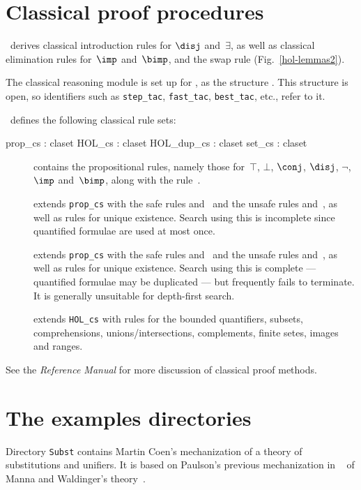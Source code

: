 \section{Classical proof procedures} \label{hol-cla-prover}
\HOL\ derives classical introduction rules for $\disj$ and~$\exists$, as
well as classical elimination rules for~$\imp$ and~$\bimp$, and the swap
rule (Fig.~\ref{hol-lemmas2}).

The classical reasoning module is set up for \HOL, as the structure 
.  This structure is open, so {\ML} identifiers such
as {\tt step_tac}, {\tt fast_tac}, {\tt best_tac}, etc., refer to it.

\HOL\ defines the following classical rule sets:
\begin{ttbox} 
prop_cs    : claset
HOL_cs     : claset
HOL_dup_cs : claset
set_cs     : claset
\end{ttbox}
\begin{description}
\item[] contains the propositional rules, namely
those for~$\top$, $\bot$, $\conj$, $\disj$, $\neg$, $\imp$ and~$\bimp$,
along with the rule~.

\item[] 
extends {\tt prop_cs} with the safe rules  and~
and the unsafe rules  and~, as well as rules for
unique existence.  Search using this is incomplete since quantified
formulae are used at most once.

\item[] 
extends {\tt prop_cs} with the safe rules  and~
and the unsafe rules  and~, as well as
rules for unique existence.  Search using this is complete --- quantified
formulae may be duplicated --- but frequently fails to terminate.  It is
generally unsuitable for depth-first search.

\item[] 
extends {\tt HOL_cs} with rules for the bounded quantifiers, subsets,
comprehensions, unions/intersections, complements, finite setes, images and
ranges.
\end{description}
\noindent
See the {\em Reference Manual} for more discussion of classical proof
methods.


\section{The examples directories}
Directory {\tt Subst} contains Martin Coen's mechanization of a theory of
substitutions and unifiers.  It is based on Paulson's previous
mechanization in {\LCF}~\cite{paulson85} of Manna and Waldinger's
theory~\cite{mw81}. 


